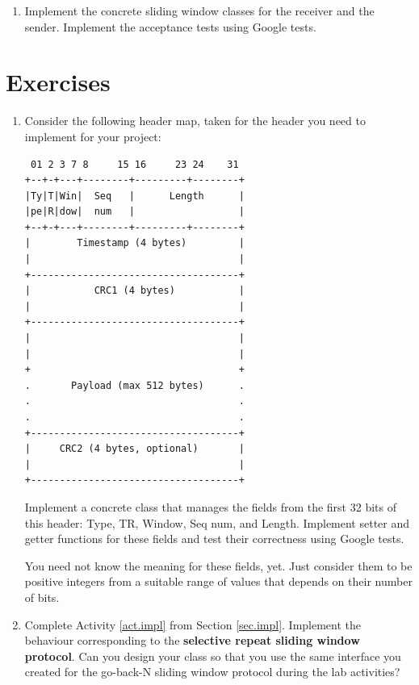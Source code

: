 \documentclass[12pt]{book}
\begin{document}
\begin{enumerate}[resume*]
\item\label{act.impl} Implement the concrete sliding window classes for the receiver and the sender. Implement the acceptance tests using Google tests. 
\end{enumerate}


\section{Exercises}

\begin{enumerate}[label=\arabic*.]
\item Consider the following header map, taken for the header you need to implement for your project:
\begin{verbatim}
 01 2 3 7 8     15 16     23 24    31
+--+-+---+--------+---------+--------+
|Ty|T|Win|  Seq   |      Length      |
|pe|R|dow|  num   |                  |
+--+-+---+--------+---------+--------+
|        Timestamp (4 bytes)         |
|                                    |
+------------------------------------+
|           CRC1 (4 bytes)           |
|                                    |
+------------------------------------+
|                                    |
|                                    |
+                                    +
.       Payload (max 512 bytes)      .
.                                    .
.                                    .
+------------------------------------+
|     CRC2 (4 bytes, optional)       |
|                                    |
+------------------------------------+
\end{verbatim}

Implement a concrete class that manages the fields from the first 32 bits of this header: Type, TR, Window, Seq num, and Length. Implement setter and getter functions for these fields and test their correctness using Google tests.

You need not know the meaning for these fields, yet. Just consider them to be positive integers from a suitable range of values that depends on their number of bits.

\item Complete Activity \ref{act.impl} from Section \ref{sec.impl}. Implement the behaviour corresponding to the \textbf{selective repeat sliding window protocol}. Can you design your class so that you use the same interface you created for the go-back-N sliding window protocol during the lab activities? 
\end{enumerate}


 
\end{document}
